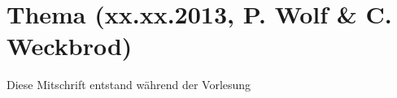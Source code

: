 \section{Thema (xx.xx.2013, P. Wolf \& C. Weckbrod)}
Diese Mitschrift entstand während der Vorlesung 
  